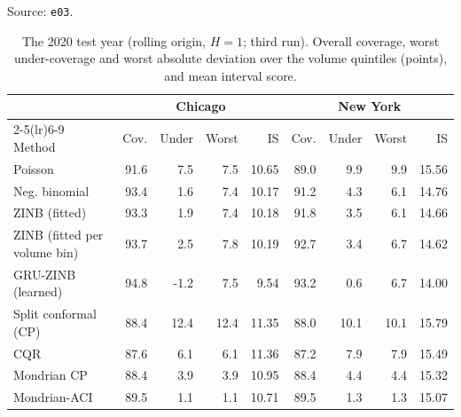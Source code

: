 \documentclass[11pt]{article}
\begin{document}
\begin{table}[H]\centering\scriptsize\setlength{\tabcolsep}{3.5pt}
\caption{The 2020 test year (rolling origin, $H=1$; third run). Overall coverage, worst under-coverage and worst absolute deviation over the volume quintiles (points), and mean interval score.} Source: \texttt{e03}.\label{tab:s14}
\begin{tabular}{lrrrrrrrr}\toprule
 & \multicolumn{4}{c}{Chicago} & \multicolumn{4}{c}{New York}\\\cmidrule(lr){2-5}\cmidrule(lr){6-9}
Method & Cov. & Under & Worst & IS & Cov. & Under & Worst & IS\\\midrule
Poisson & 91.6 & 7.5 & 7.5 & 10.65 & 89.0 & 9.9 & 9.9 & 15.56 \\
Neg. binomial & 93.4 & 1.6 & 7.4 & 10.17 & 91.2 & 4.3 & 6.1 & 14.76 \\
ZINB (fitted) & 93.3 & 1.9 & 7.4 & 10.18 & 91.8 & 3.5 & 6.1 & 14.66 \\
ZINB (fitted per volume bin) & 93.7 & 2.5 & 7.8 & 10.19 & 92.7 & 3.4 & 6.7 & 14.62 \\
GRU-ZINB (learned) & 94.8 & -1.2 & 7.5 & 9.54 & 93.2 & 0.6 & 6.7 & 14.00 \\
Split conformal (CP) & 88.4 & 12.4 & 12.4 & 11.35 & 88.0 & 10.1 & 10.1 & 15.79 \\
CQR & 87.6 & 6.1 & 6.1 & 11.36 & 87.2 & 7.9 & 7.9 & 15.49 \\
Mondrian CP & 88.4 & 3.9 & 3.9 & 10.95 & 88.4 & 4.4 & 4.4 & 15.32 \\
Mondrian-ACI & 89.5 & 1.1 & 1.1 & 10.71 & 89.5 & 1.3 & 1.3 & 15.07 \\
\bottomrule\end{tabular}\end{table}
\end{document}
